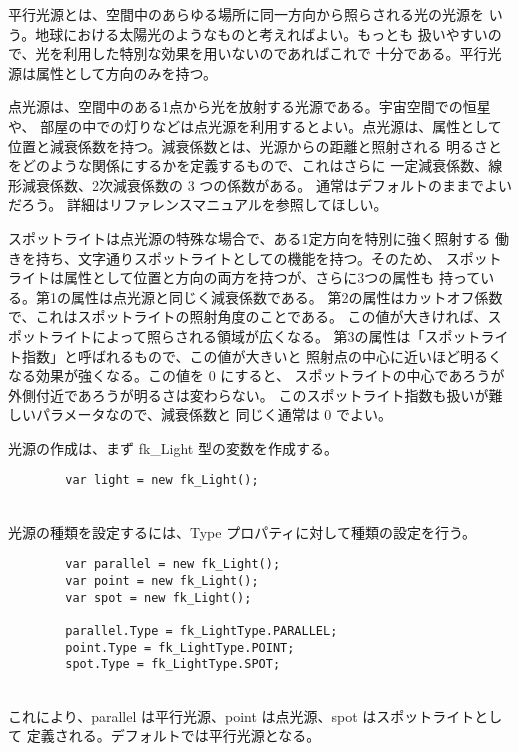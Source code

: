 平行光源とは、空間中のあらゆる場所に同一方向から照らされる光の光源を
いう。地球における太陽光のようなものと考えればよい。もっとも
扱いやすいので、光を利用した特別な効果を用いないのであればこれで
十分である。平行光源は属性として方向のみを持つ。

点光源は、空間中のある1点から光を放射する光源である。宇宙空間での恒星や、
部屋の中での灯りなどは点光源を利用するとよい。点光源は、属性として
位置と減衰係数を持つ。減衰係数とは、光源からの距離と照射される
明るさとをどのような関係にするかを定義するもので、これはさらに
一定減衰係数、線形減衰係数、2次減衰係数の 3 つの係数がある。
通常はデフォルトのままでよいだろう。
詳細はリファレンスマニュアルを参照してほしい。

スポットライトは点光源の特殊な場合で、ある1定方向を特別に強く照射する
働きを持ち、文字通りスポットライトとしての機能を持つ。そのため、
スポットライトは属性として位置と方向の両方を持つが、さらに3つの属性も
持っている。第1の属性は点光源と同じく減衰係数である。
第2の属性はカットオフ係数で、これはスポットライトの照射角度のことである。
この値が大きければ、スポットライトによって照らされる領域が広くなる。
第3の属性は「スポットライト指数」と呼ばれるもので、この値が大きいと
照射点の中心に近いほど明るくなる効果が強くなる。この値を 0 にすると、
スポットライトの中心であろうが外側付近であろうが明るさは変わらない。
このスポットライト指数も扱いが難しいパラメータなので、減衰係数と
同じく通常は 0 でよい。

光源の作成は、まず fk\_Light 型の変数を作成する。
\\
\begin{screen}
\begin{verbatim}
        var light = new fk_Light();
\end{verbatim}
\end{screen}
~ \\
光源の種類を設定するには、Type プロパティに対して種類の設定を行う。
\\
\begin{screen}
\begin{verbatim}
        var parallel = new fk_Light();
        var point = new fk_Light();
        var spot = new fk_Light();

        parallel.Type = fk_LightType.PARALLEL;
        point.Type = fk_LightType.POINT;
        spot.Type = fk_LightType.SPOT;
\end{verbatim}
\end{screen}
~ \\
これにより、parallel は平行光源、point は点光源、spot はスポットライトとして
定義される。デフォルトでは平行光源となる。

